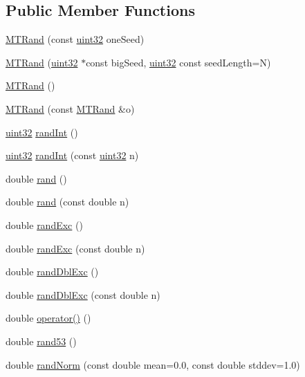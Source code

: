 \subsection*{Public Member Functions}
\begin{DoxyCompactItemize}
\item 
\hyperlink{classMTRand_a172bc7e7cf1e578ef3f9c90a8cee3eb1}{MTRand} (const \hyperlink{classMTRand_a45478edf9e24dcd2a5164bac3889d6a2}{uint32} oneSeed)
\item 
\hyperlink{classMTRand_a380e79e0192b46426abcefa6e2dd082e}{MTRand} (\hyperlink{classMTRand_a45478edf9e24dcd2a5164bac3889d6a2}{uint32} $\ast$const bigSeed, \hyperlink{classMTRand_a45478edf9e24dcd2a5164bac3889d6a2}{uint32} const seedLength=N)
\item 
\hyperlink{classMTRand_a265dc65546e26073c0d5f8787b045a1d}{MTRand} ()
\item 
\hyperlink{classMTRand_aff69d4a4ec88475bab03a295e8fb0f60}{MTRand} (const \hyperlink{classMTRand}{MTRand} \&o)
\item 
\hyperlink{classMTRand_a45478edf9e24dcd2a5164bac3889d6a2}{uint32} \hyperlink{classMTRand_ad1008efd4fe0e8aae30459c2c58cfe35}{randInt} ()
\item 
\hyperlink{classMTRand_a45478edf9e24dcd2a5164bac3889d6a2}{uint32} \hyperlink{classMTRand_a3515bbf6e1b46680a4ce6968451942b6}{randInt} (const \hyperlink{classMTRand_a45478edf9e24dcd2a5164bac3889d6a2}{uint32} n)
\item 
double \hyperlink{classMTRand_a76d129a2d850c24ff4a0613f299cf3a5}{rand} ()
\item 
double \hyperlink{classMTRand_aa4fe82fc27fd81414ce7554093a9766b}{rand} (const double n)
\item 
double \hyperlink{classMTRand_afd05e468983b3a3d66ce0f403bd666af}{randExc} ()
\item 
double \hyperlink{classMTRand_aa1e89d6c7ac8737567b3ccf8fe70b6de}{randExc} (const double n)
\item 
double \hyperlink{classMTRand_a4d3a475aa72fe6d1a6d7d9e16d6a732e}{randDblExc} ()
\item 
double \hyperlink{classMTRand_a1a81d8f00de8f553d4b8626d64e1c544}{randDblExc} (const double n)
\item 
double \hyperlink{classMTRand_abbb87a08d622d58fdee0eea4cb5471a0}{operator()} ()
\item 
double \hyperlink{classMTRand_a15f4daf79febbe4ff43c3e6ce2c4fcbe}{rand53} ()
\item 
double \hyperlink{classMTRand_a4c284f626b6d40a0367ff2a949ea1944}{randNorm} (const double mean=0.0, const double stddev=1.0)

\end{DoxyCompactItemize}
